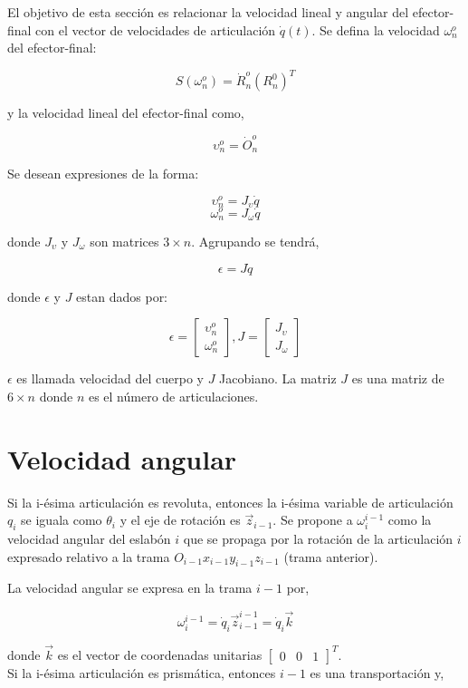 \documentclass[10pt,a4paper]{article}
\begin{document}
El objetivo de esta sección es relacionar la velocidad lineal y angular del efector-final con el vector de velocidades de articulación $\dot{q}(t)$. Se defina la velocidad $\omega_n^o$ del efector-final:

$$ S(\omega_n^o) = \dot{R}_n^o (R_n^0)^T $$

y la velocidad lineal del efector-final como,

$$ \upsilon_n^o = \dot{O}_n^o $$

Se desean expresiones de la forma:

$$ \upsilon_n^o = J_{\upsilon} \dot{q} $$
$$ \omega_n^o = J_{\omega} \dot{q} $$

donde $J_{\upsilon}$ y $J_{\omega}$ son matrices $3 \times n$. Agrupando se tendrá,

$$ \epsilon = J \dot{q} $$

donde $\epsilon$ y $J$ estan dados por:

$$ \epsilon =
\begin{bmatrix}
	\upsilon_n^o\\
	\omega_n^o
\end{bmatrix},
J =
\begin{bmatrix}
	J_{\upsilon}\\
	J_{\omega}
\end{bmatrix}
$$

$\epsilon$ es llamada velocidad del cuerpo y $J$ Jacobiano. La matriz $J$ es una matriz de $ 6 \times n$ donde $n$ es el número de articulaciones.

\section{Velocidad angular}

Si la i-ésima articulación es revoluta, entonces la i-ésima variable de articulación $q_i$ se iguala como $\theta_i$ y el eje de rotación es $\vec{z}_{i-1}$. Se propone a $\omega_i^{i-1}$ como la velocidad angular del eslabón $i$ que se propaga por la rotación de la articulación $i$ expresado relativo a la trama $O_{i-1} x_{i-1} y_{i-1}  z_{i-1}$ (trama anterior).

La velocidad angular se expresa en la trama $i-1$ por,

$$ \omega_i^{i-1} = \dot{q}_i \vec{z}_{i-1}^{i-1} = \dot{q}_i \vec{k} $$

donde $\vec{k}$ es el vector de coordenadas unitarias
$ \begin{bmatrix}
	0 & 0 & 1
\end{bmatrix}^T$. \\
Si la i-ésima articulación es prismática, entonces $i-1$ es una transportación y,
\end{document}

